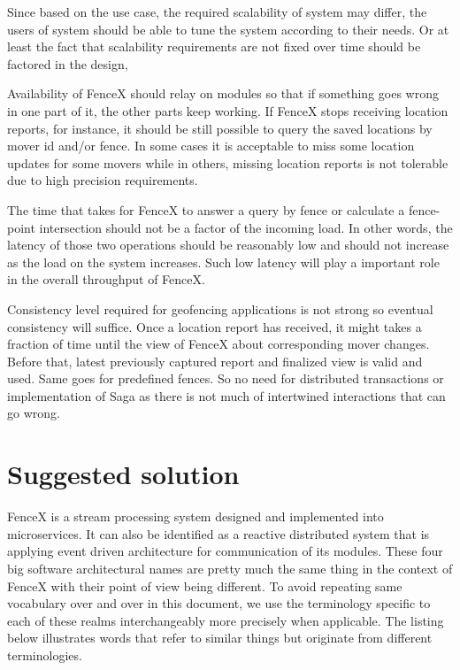 \documentclass[a4]{report}
\begin{document}
        Since based on the use case, the required scalability of system may differ, the users of system should be able to
        tune the system according to their needs.
        Or at least the fact that scalability requirements are not fixed over time should be factored in the design,

        Availability of FenceX should relay on modules so that if something goes wrong in one part of it, the other parts
        keep working.
        If FenceX stops receiving location reports, for instance, it should be still possible to query the saved
        locations by mover id and/or fence.
        In some cases it is acceptable to miss some location updates for some movers while in others, missing location
        reports is not tolerable due to high precision requirements.

        The time that takes for FenceX to answer a query by fence or calculate a fence-point intersection should not be a
        factor of the incoming load.
        In other words, the latency of those two operations should be reasonably low and should not increase as the load
        on the system increases.
        Such low latency will play a important role in the overall throughput of FenceX.

        Consistency level required for geofencing applications is not strong so eventual consistency will suffice.
        Once a location report has received, it might takes a fraction of time until the view of FenceX about
        corresponding mover changes.
        Before that, latest previously captured report and finalized view is valid and used.
        Same goes for predefined fences.
        So no need for distributed transactions or implementation of Saga as there is not much of intertwined
        interactions that can go wrong.

        \chapter{Suggested solution}
        FenceX is a stream processing system designed and implemented into microservices.
        It can also be identified as a reactive distributed system that is applying event driven architecture for
        communication of its modules.
        These four big software architectural names are pretty much the same thing in the context of FenceX with their
        point of view being different.
        To avoid repeating same vocabulary over and over in this document, we use the terminology specific to each of
        these realms interchangeably more precisely when applicable.
        The listing below illustrates words that refer to similar things but originate from different terminologies.
\end{document}
